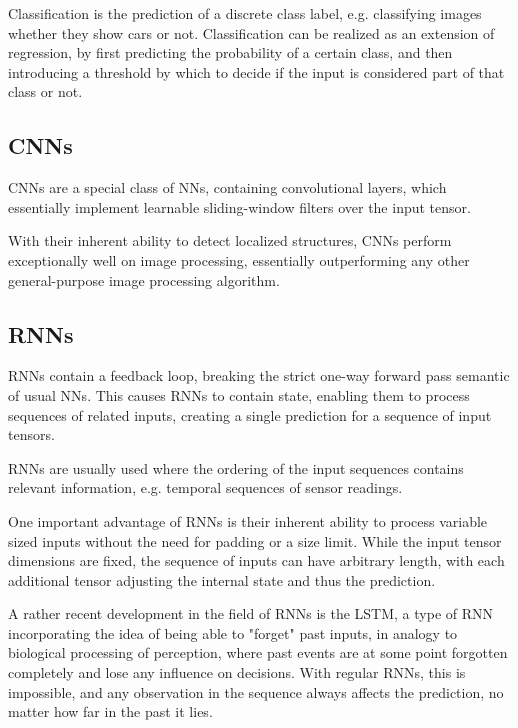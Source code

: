Classification is the prediction of a discrete class label, e.g. classifying images whether they show cars or not. Classification can be realized as an extension of regression, by first predicting the probability of a certain class, and then introducing a threshold by which to decide if the input is considered part of that class or not.

\subsection{\glspl{CNN}}

\glspl{CNN} are a special class of \glspl{NN}, containing convolutional layers, which essentially implement learnable sliding-window filters over the input tensor. 

With their inherent ability to detect localized structures, \glspl{CNN} perform exceptionally well on image processing, essentially outperforming any other general-purpose image processing algorithm.\cite{TODO}

\subsection{\glspl{RNN}}

\glspl{RNN} contain a feedback loop, breaking the strict one-way forward pass semantic of usual \glspl{NN}. This causes \glspl{RNN} to contain state, enabling them to process sequences of related inputs, creating a single prediction for a sequence of input tensors.

\glspl{RNN} are usually used where the ordering of the input sequences contains relevant information, e.g. temporal sequences of sensor readings.

One important advantage of \glspl{RNN} is their inherent ability to process variable sized inputs without the need for padding or a size limit. While the input tensor dimensions are fixed, the sequence of inputs can have arbitrary length, with each additional tensor adjusting the internal state and thus the prediction.

A rather recent development in the field of \glspl{RNN} is the \gls{LSTM}\cite{TODO}, a type of \gls{RNN} incorporating the idea of being able to "forget" past inputs, in analogy to biological processing of perception, where past events are at some point forgotten completely and lose any influence on decisions. With regular \glspl{RNN}, this is impossible, and any observation in the sequence always affects the prediction, no matter how far in the past it lies.\cite{TODO}

